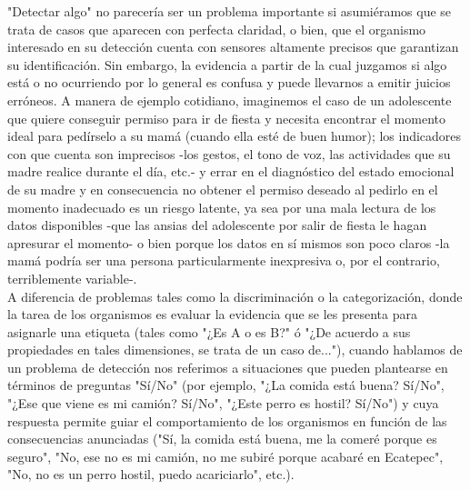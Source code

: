 "Detectar algo" no parecería ser un problema importante si asumiéramos que se trata de casos que aparecen con perfecta claridad, o bien, que el organismo interesado en su detección cuenta con sensores altamente precisos que garantizan su identificación. Sin embargo, la evidencia a partir de la cual juzgamos si algo está o no ocurriendo por lo general es confusa y puede llevarnos a emitir juicios erróneos. A manera de ejemplo cotidiano, imaginemos el caso de un adolescente que quiere conseguir permiso para ir de fiesta y necesita encontrar el momento ideal para pedírselo a su mamá (cuando ella esté de buen humor); los indicadores con que cuenta son imprecisos -los gestos, el tono de voz, las actividades que su madre realice durante el día, etc.- y errar en el diagnóstico del estado emocional de su madre y en consecuencia no obtener el permiso deseado al pedirlo en el momento inadecuado es un riesgo latente, ya sea por una mala lectura de los datos disponibles -que las ansias del adolescente por salir de fiesta le hagan apresurar el momento- o bien porque los datos en sí mismos son poco claros -la mamá podría ser una persona particularmente inexpresiva o, por el contrario, terriblemente variable-.\\ 

A diferencia de problemas tales como la discriminación o la categorización, donde la tarea de los organismos es evaluar la evidencia que se les presenta para asignarle una etiqueta (tales como "¿Es A o es B?" ó "¿De acuerdo a sus propiedades en tales dimensiones, se trata de un caso de..."), cuando hablamos de un problema de detección nos referimos a situaciones que pueden plantearse en términos de preguntas "Sí/No" (por ejemplo, "¿La comida está buena? Sí/No", "¿Ese que viene es mi camión? Sí/No", "¿Este perro es hostil? Sí/No") y cuya respuesta permite guiar el comportamiento de los organismos en función de las consecuencias anunciadas ("Sí, la comida está buena, me la comeré porque es seguro", "No, ese no es mi camión, no me subiré porque acabaré en Ecatepec", "No, no es un perro hostil, puedo acariciarlo", etc.).\\ 

